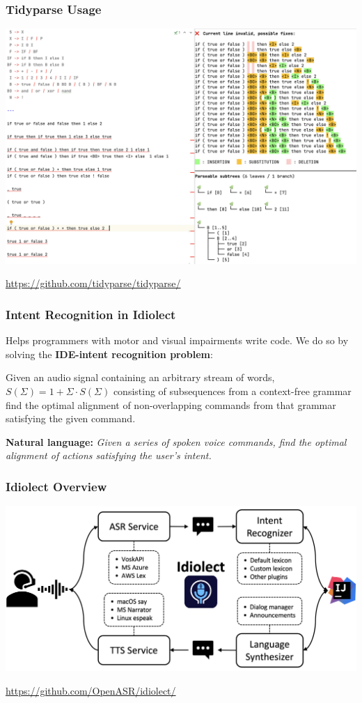 \documentclass[mathserif,notheorems]{beamer}
\theoremstyle{plain} %
\theoremstyle{definition} %
\begin{document}
\begin{frame}
  \frametitle{Tidyparse Usage}
  \includegraphics[scale=0.25]{tidyparse_screenshot}
  \begin{center}\url{https://github.com/tidyparse/tidyparse/}\end{center}
\end{frame}

\begin{frame}
  \frametitle{Intent Recognition in Idiolect}
  Helps programmers with motor and visual impairments write code. We do so by solving the \textbf{IDE-intent recognition problem}:\vspace{10pt}

  Given an audio signal containing an arbitrary stream of words, $S(\Sigma) = 1 + \Sigma\cdot S(\Sigma)$ consisting of subsequences from a context-free grammar find the optimal alignment of non-overlapping commands from that grammar satisfying the given command.\vspace{10pt}

  \textbf{Natural language:}
  \textit{Given a series of spoken voice commands, find the optimal alignment of actions satisfying the user's intent.}

\end{frame}

\begin{frame}
  \frametitle{Idiolect Overview}
  \includegraphics[scale=0.185]{idiolect_overview}
  \begin{center}\url{https://github.com/OpenASR/idiolect/}\end{center}
\end{frame}
\end{document}
